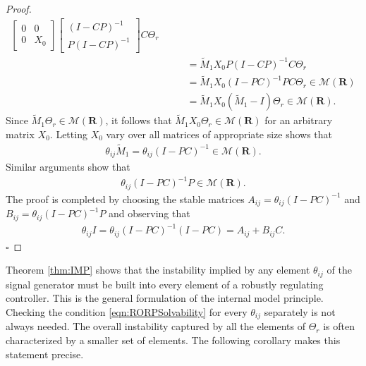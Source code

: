 \documentclass[11pt, a4paper]{amsart}
\newcommand{\inv}{^{-1}}
\newcommand{\matrices}[1]{\mathcal{M}\left( #1 \right)}		%
\newcommand{\Plant}{P}										%
\newcommand{\Cont}{C}										%
\newcommand{\Gen}{\Theta}									%
\newcommand{\gen}{\theta}									%
\newcommand{\stable}{\mathbf{R}}							%
\begin{document}
\begin{proof}
\begin{align*}
\begin{bmatrix}
0 & 0\\
0 & X_0
\end{bmatrix}
\begin{bmatrix}
(I-\Cont\Plant)\inv \\ \Plant(I-\Cont\Plant)\inv
\end{bmatrix}
\Cont\Gen_r\\
&\qquad = \widetilde{M}_1 X_0 \Plant(I-\Cont\Plant)\inv\Cont\Gen_r\\
&\qquad = \widetilde{M}_1 X_0 (I-\Plant\Cont)\inv\Plant\Cont\Gen_r\in\matrices{\stable}\\
&\qquad = \widetilde{M}_1 X_0 (\widetilde{M}_1-I)\Gen_r\in\matrices{\stable}.
\end{align*}
Since $\widetilde{M}_1\Gen_r\in\matrices{\stable}$, it follows that
$\widetilde{M}_1X_0\Gen_r\in\matrices{\stable}$ for an arbitrary matrix $X_0$. Letting $X_0$ vary over all matrices of appropriate size shows that
\begin{align*}
\gen_{ij}\widetilde{M}_1=\gen_{ij}(I-\Plant\Cont)\inv\in\matrices{\stable}.
\end{align*}
Similar arguments show that
\begin{align*}
\gen_{ij}(I-\Plant\Cont)\inv\Plant \in\matrices{\stable}.
\end{align*}
The proof is completed by choosing the stable matrices $A_{ij}=\gen_{ij}(I-\Plant\Cont)\inv$ and $B_{ij}=\gen_{ij}(I-\Plant\Cont)\inv\Plant$ and observing that
\begin{align*}
\gen_{ij} I=\gen_{ij} (I-\Plant\Cont)\inv(I-\Plant\Cont)=A_{ij}+B_{ij}\Cont.
\end{align*}\hfill$\square$
\end{proof}

Theorem \ref{thm:IMP} shows that the instability implied by any element $\gen_{ij}$ of the signal generator must be built into every element of a robustly regulating controller. This is the general formulation of the internal model principle. Checking the condition \eqref{eqn:RORPSolvability} for every $\gen_{ij}$ separately is not always needed. The overall instability captured by all the elements of $\Gen_r$ is often characterized by a smaller set of elements. The following corollary makes this statement precise.
\end{document}
